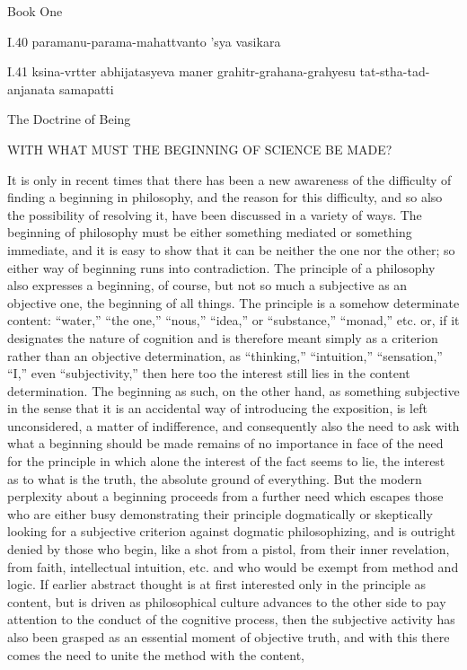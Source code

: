 Book One

I.40
paramanu-parama-mahattvanto 'sya vasikara

I.41
ksina-vrtter abhijatasyeva maner grahitr-grahana-grahyesu
tat-stha-tad-anjanata samapatti

The Doctrine of Being

WITH WHAT MUST THE BEGINNING OF SCIENCE BE MADE?

It is only in recent times that there has been a new awareness of
the difficulty of finding a beginning in philosophy,
and the reason for this difficulty,
and so also the possibility of resolving it,
have been discussed in a variety of ways.
The beginning of philosophy must be
either something mediated or something immediate,
and it is easy to show that it can be neither
the one nor the other; so either way of beginning runs into contradiction.
The principle of a philosophy also expresses a beginning, of course,
but not so much a subjective as an objective one,
the beginning of all things.
The principle is a somehow determinate content:
“water,” “the one,” “nous,” “idea,” or “substance,” “monad,” etc. or,
if it designates the nature of cognition and is therefore meant simply
as a criterion rather than an objective determination,
as “thinking,” “intuition,” “sensation,” “I,” even “subjectivity,” then
here too the interest still lies in the content determination.
The beginning as such, on the other hand, as something
subjective in the sense that it is an accidental way of introducing the
exposition, is left unconsidered, a matter of indifference, and consequently
also the need to ask with what a beginning should be made remains of no
importance in face of the need for the principle in which alone the interest
of the fact seems to lie, the interest as to what is the truth, the absolute
ground of everything.
But the modern perplexity about a beginning proceeds from
a further need which escapes those who are either busy demonstrating
their principle dogmatically or skeptically looking for
a subjective criterion against dogmatic philosophizing,
and is outright denied by those who begin, like a shot from a pistol,
from their inner revelation, from faith, intellectual intuition, etc. and
who would be exempt from method and logic.
If earlier abstract thought is at first interested only
in the principle as content, but is driven as philosophical culture
advances to the other side to pay attention to the conduct of
the cognitive process, then the subjective activity has
also been grasped as an essential moment of objective truth, and
with this there comes the need to unite the method with the content,
